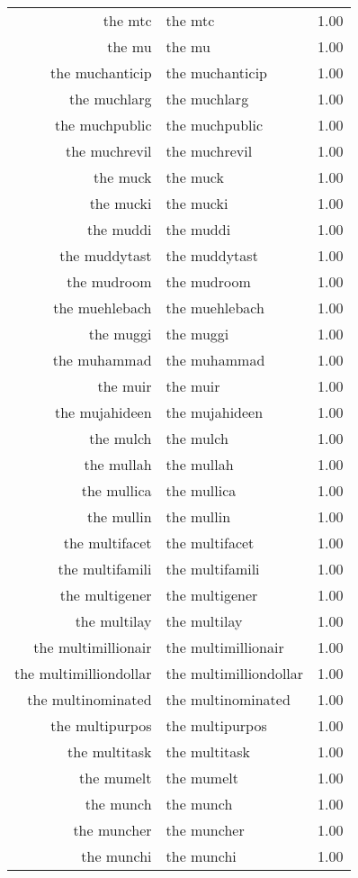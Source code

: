 \begin{table}[ht]
\begin{tabular}{rlr}
  the mtc & the mtc & 1.00 \\ 
  the mu & the mu & 1.00 \\ 
  the muchanticip & the muchanticip & 1.00 \\ 
  the muchlarg & the muchlarg & 1.00 \\ 
  the muchpublic & the muchpublic & 1.00 \\ 
  the muchrevil & the muchrevil & 1.00 \\ 
  the muck & the muck & 1.00 \\ 
  the mucki & the mucki & 1.00 \\ 
  the muddi & the muddi & 1.00 \\ 
  the muddytast & the muddytast & 1.00 \\ 
  the mudroom & the mudroom & 1.00 \\ 
  the muehlebach & the muehlebach & 1.00 \\ 
  the muggi & the muggi & 1.00 \\ 
  the muhammad & the muhammad & 1.00 \\ 
  the muir & the muir & 1.00 \\ 
  the mujahideen & the mujahideen & 1.00 \\ 
  the mulch & the mulch & 1.00 \\ 
  the mullah & the mullah & 1.00 \\ 
  the mullica & the mullica & 1.00 \\ 
  the mullin & the mullin & 1.00 \\ 
  the multifacet & the multifacet & 1.00 \\ 
  the multifamili & the multifamili & 1.00 \\ 
  the multigener & the multigener & 1.00 \\ 
  the multilay & the multilay & 1.00 \\ 
  the multimillionair & the multimillionair & 1.00 \\ 
  the multimilliondollar & the multimilliondollar & 1.00 \\ 
  the multinominated & the multinominated & 1.00 \\ 
  the multipurpos & the multipurpos & 1.00 \\ 
  the multitask & the multitask & 1.00 \\ 
  the mumelt & the mumelt & 1.00 \\ 
  the munch & the munch & 1.00 \\ 
  the muncher & the muncher & 1.00 \\ 
  the munchi & the munchi & 1.00 \\ 

\end{tabular}
\end{table}
